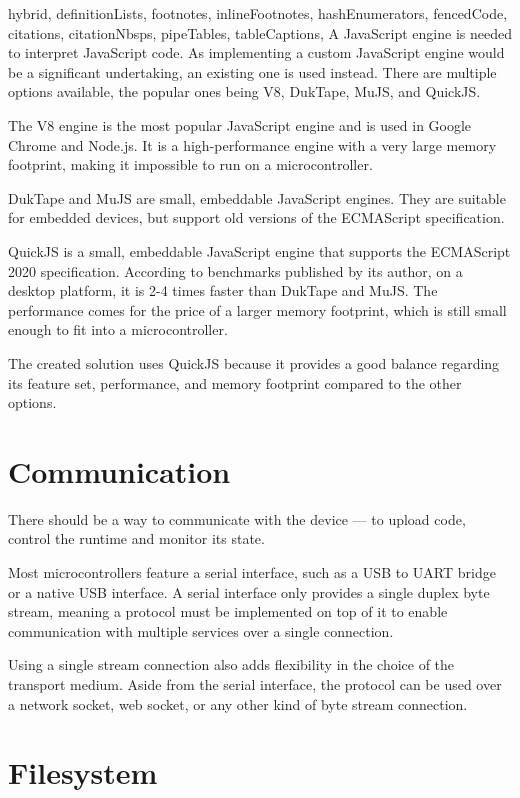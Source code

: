 \begin{markdown*}{%
  hybrid,
  definitionLists,
  footnotes,
  inlineFootnotes,
  hashEnumerators,
  fencedCode,
  citations,
  citationNbsps,
  pipeTables,
  tableCaptions,
}
A JavaScript engine is needed to interpret JavaScript code. As implementing a custom JavaScript engine would be a significant undertaking, an existing one is used instead. There are multiple options available, the popular ones being V8\cite{v8}, DukTape\cite{duktape}, MuJS\cite{mujs}, and QuickJS\cite{quickjs}.

The V8 engine is the most popular JavaScript engine and is used in Google Chrome and Node.js. It is a high-performance engine with a very large memory footprint, making it impossible to run on a microcontroller.

DukTape and MuJS are small, embeddable JavaScript engines. They are suitable for embedded devices, but support old versions of the ECMAScript specification.

QuickJS is a small, embeddable JavaScript engine that supports the ECMAScript 2020 specification. According to benchmarks published by its author\cite{quickjs-bench}, on a desktop platform, it is 2-4 times faster than DukTape and MuJS. The performance comes for the price of a larger memory footprint, which is still small enough to fit into a microcontroller.

The created solution uses QuickJS because it provides a good balance regarding its feature set, performance, and memory footprint compared to the other options.

\section{Communication}

There should be a way to communicate with the device --- to upload code, control the runtime and monitor its state.

Most microcontrollers feature a serial interface, such as a USB to UART bridge or a native USB interface. A serial interface only provides a single duplex byte stream, meaning a protocol must be implemented on top of it to enable communication with multiple services over a single connection.

Using a single stream connection also adds flexibility in the choice of the transport medium. Aside from the serial interface, the protocol can be used over a network socket, web socket, or any other kind of byte stream connection.

\section{Filesystem}


\end{markdown*}
